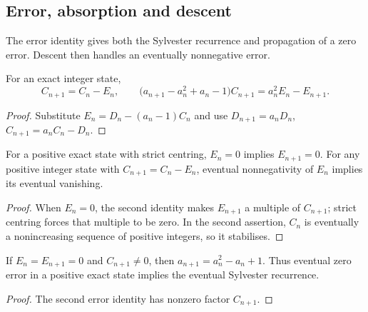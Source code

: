 \documentclass[11pt]{article}
\begin{document}
\subsection{Error, absorption and descent}\label{sec:defect}\label{sec:descent}
The error identity gives both the Sylvester recurrence and propagation
of a zero error. Descent then handles an eventually nonnegative error.

\begin{proposition}\label{res:update}\label{res:defect}
For an exact integer state,
\[
 C_{n+1}=C_n-E_n,\qquad
 \bigl(a_{n+1}-a_n^2+a_n-1\bigr)C_{n+1}=a_n^2E_n-E_{n+1}.
\]
\end{proposition}
\begin{proof}
Substitute $E_n=D_n-(a_n-1)C_n$ and use
$D_{n+1}=a_nD_n$, $C_{n+1}=a_nC_n-D_n$.
\end{proof}

\begin{theorem}\label{res:absorb}\label{res:descent}
For a positive exact state with strict centring, $E_n=0$ implies
$E_{n+1}=0$. For any positive integer state with $C_{n+1}=C_n-E_n$,
eventual nonnegativity of $E_n$ implies its eventual vanishing.
\end{theorem}
\begin{proof}
When $E_n=0$, the second identity makes $E_{n+1}$ a multiple of
$C_{n+1}$; strict centring forces that multiple to be zero. In the second
assertion, $C_n$ is eventually a nonincreasing sequence of positive
integers, so it stabilises.
\end{proof}

\begin{corollary}\label{res:step}\label{res:eventual}
If $E_n=E_{n+1}=0$ and $C_{n+1}\ne0$, then
$a_{n+1}=a_n^2-a_n+1$. Thus eventual zero error in a positive exact state
implies the eventual Sylvester recurrence.
\end{corollary}
\begin{proof}
The second error identity has nonzero factor $C_{n+1}$.
\end{proof}
\end{document}
